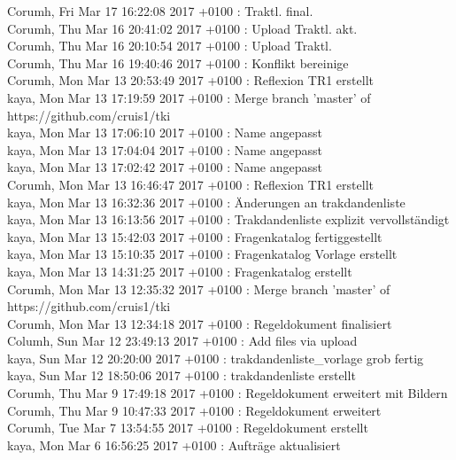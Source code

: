 Corumh, Fri Mar 17 16:22:08 2017 +0100 : Traktl. final.\\
Corumh, Thu Mar 16 20:41:02 2017 +0100 : Upload Traktl. akt.\\
Corumh, Thu Mar 16 20:10:54 2017 +0100 : Upload Traktl.\\
Corumh, Thu Mar 16 19:40:46 2017 +0100 : Konflikt bereinige\\
Corumh, Mon Mar 13 20:53:49 2017 +0100 : Reflexion TR1 erstellt\\
kaya, Mon Mar 13 17:19:59 2017 +0100 : Merge branch 'master' of https://github.com/cruis1/tki\\
kaya, Mon Mar 13 17:06:10 2017 +0100 : Name angepasst\\
kaya, Mon Mar 13 17:04:04 2017 +0100 : Name angepasst\\
kaya, Mon Mar 13 17:02:42 2017 +0100 : Name angepasst\\
Corumh, Mon Mar 13 16:46:47 2017 +0100 : Reflexion TR1 erstellt\\
kaya, Mon Mar 13 16:32:36 2017 +0100 : Änderungen an trakdandenliste\\
kaya, Mon Mar 13 16:13:56 2017 +0100 : Trakdandenliste explizit vervollständigt\\
kaya, Mon Mar 13 15:42:03 2017 +0100 : Fragenkatalog fertiggestellt\\
kaya, Mon Mar 13 15:10:35 2017 +0100 : Fragenkatalog Vorlage erstellt\\
kaya, Mon Mar 13 14:31:25 2017 +0100 : Fragenkatalog erstellt\\
Corumh, Mon Mar 13 12:35:32 2017 +0100 : Merge branch 'master' of https://github.com/cruis1/tki\\
Corumh, Mon Mar 13 12:34:18 2017 +0100 : Regeldokument finalisiert\\
Columh, Sun Mar 12 23:49:13 2017 +0100 : Add files via upload\\
kaya, Sun Mar 12 20:20:00 2017 +0100 : trakdandenliste\_vorlage grob fertig\\
kaya, Sun Mar 12 18:50:06 2017 +0100 : trakdandenliste erstellt\\
Corumh, Thu Mar 9 17:49:18 2017 +0100 : Regeldokument erweitert mit Bildern\\
Corumh, Thu Mar 9 10:47:33 2017 +0100 : Regeldokument erweitert\\
Corumh, Tue Mar 7 13:54:55 2017 +0100 : Regeldokument erstellt\\
kaya, Mon Mar 6 16:56:25 2017 +0100 : Aufträge aktualisiert\\
